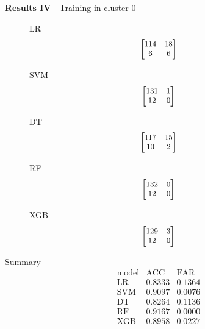 \documentclass[12pt,aspectratio=43]{beamer}
\begin{document}
\begin{frame}{\textbf{Results IV}　{Training in cluster 0}}
\linespread{0.9}
{\small
\begin{figure}[h]
\centering

\begin{minipage}{0.28\linewidth}
\raggedright
{\small LR}
$$
\small
\begin{bmatrix}
114 & 18 \\
6  & 6
\end{bmatrix}
$$
\end{minipage}
\begin{minipage}{0.28\linewidth}
\raggedright
{\small SVM}
$$
\small
\begin{bmatrix}
131 & 1 \\
12  & 0
\end{bmatrix}
$$
\end{minipage}
\begin{minipage}{0.28\linewidth}
\raggedright
{\small DT}
$$
\small
\begin{bmatrix}
117 & 15 \\
10  & 2
\end{bmatrix}
$$
\end{minipage}

\vspace{0.5em}

\begin{minipage}{0.28\linewidth}
\raggedright
{\small RF}
$$
\small
\begin{bmatrix}
132 & 0 \\
12  & 0
\end{bmatrix}
$$
\end{minipage}
\begin{minipage}{0.28\linewidth}
\raggedright
{\small XGB}
$$
\small
\begin{bmatrix}
129 & 3 \\
12  & 0
\end{bmatrix}
$$
\end{minipage}

\end{figure}
}

{\small
Summary
$$
\begin{array}{l|cc}
\text{model} & \text{ACC} & \text{FAR} \\
\hline
\text{LR} & 0.8333 & 0.1364 \\
\text{SVM} & 0.9097 & 0.0076 \\
\text{DT} & 0.8264 & 0.1136\\
\text{RF} & 0.9167 & 0.0000 \\
\text{XGB} & 0.8958 & 0.0227 \\
\end{array}
$$
}

\end{frame}
\end{document}
